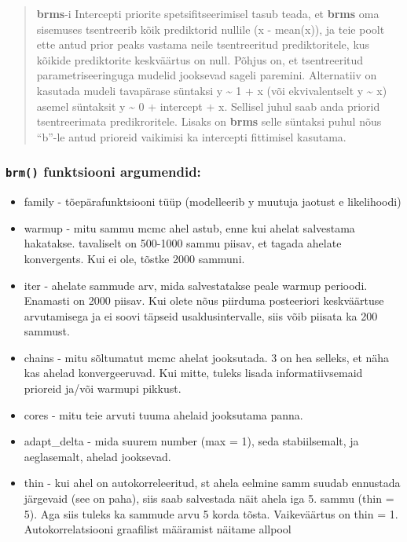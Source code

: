 \documentclass[]{article}
\begin{document}
\begin{quote}
\textbf{brms}-i Intercepti priorite spetsifitseerimisel tasub teada, et
\textbf{brms} oma sisemuses tsentreerib kõik prediktorid nullile (x -
mean(x)), ja teie poolt ette antud prior peaks vastama neile
tsentreeritud prediktoritele, kus kõikide prediktorite keskväärtus on
null. Põhjus on, et tsentreeritud parametriseeringuga mudelid jooksevad
sageli paremini. Alternatiiv on kasutada mudeli tavapärase süntaksi y
\textasciitilde{} 1 + x (või ekvivalentselt y \textasciitilde{} x)
asemel süntaksit y \textasciitilde{} 0 + intercept + x. Sellisel juhul
saab anda priorid tsentreerimata predikroritele. Lisaks on \textbf{brms}
selle süntaksi puhul nõus ``b''-le antud prioreid vaikimisi ka
intercepti fittimisel kasutama.
\end{quote}

\subsubsection{\texorpdfstring{\texttt{brm()} funktsiooni
argumendid:}{brm() funktsiooni argumendid:}}\label{brm-funktsiooni-argumendid}

\begin{itemize}
\item
  family - tõepärafunktsiooni tüüp (modelleerib y muutuja jaotust e
  likelihoodi)
\item
  warmup - mitu sammu mcmc ahel astub, enne kui ahelat salvestama
  hakatakse. tavaliselt on 500-1000 sammu piisav, et tagada ahelate
  konvergents. Kui ei ole, tõstke 2000 sammuni.
\item
  iter - ahelate sammude arv, mida salvestatakse peale warmup perioodi.
  Enamasti on 2000 piisav. Kui olete nõus piirduma posteeriori
  keskväärtuse arvutamisega ja ei soovi täpseid usaldusintervalle, siis
  võib piisata ka 200 sammust.
\item
  chains - mitu sõltumatut mcmc ahelat jooksutada. 3 on hea selleks, et
  näha kas ahelad konvergeeruvad. Kui mitte, tuleks lisada
  informatiivsemaid prioreid ja/või warmupi pikkust.
\item
  cores - mitu teie arvuti tuuma ahelaid jooksutama panna.
\item
  adapt\_delta - mida suurem number (max = 1), seda stabiilsemalt, ja
  aeglasemalt, ahelad jooksevad.
\item
  thin - kui ahel on autokorreleeritud, st ahela eelmine samm suudab
  ennustada järgevaid (see on paha), siis saab salvestada näit ahela iga
  5. sammu (thin = 5). Aga siis tuleks ka sammude arvu 5 korda tõsta.
  Vaikeväärtus on thin = 1. Autokorrelatsiooni graafilist määramist
  näitame allpool
\end{itemize}
\end{document}
